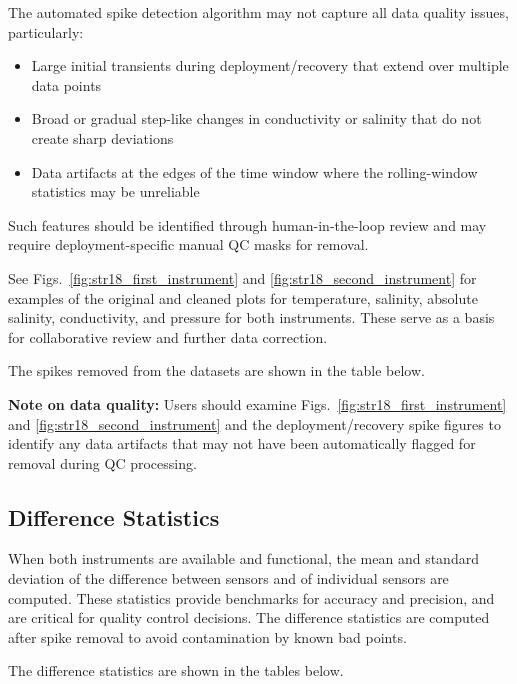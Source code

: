 The automated spike detection algorithm may not capture all data quality issues, particularly:
\begin{itemize}
    \item Large initial transients during deployment/recovery that extend over multiple data points
    \item Broad or gradual step-like changes in conductivity or salinity that do not create sharp deviations
    \item Data artifacts at the edges of the time window where the rolling-window statistics may be unreliable
\end{itemize}
Such features should be identified through human-in-the-loop review and may require deployment-specific manual QC masks for removal.

See Figs.~\ref{fig:str18_first_instrument} and \ref{fig:str18_second_instrument} for examples of the original and cleaned plots for temperature, salinity, absolute salinity, conductivity, and pressure for both instruments.
These serve as a basis for collaborative review and further data correction.

The spikes removed from the datasets are shown in the table below.



\textbf{Note on data quality:} Users should examine Figs.~\ref{fig:str18_first_instrument} and \ref{fig:str18_second_instrument} and the deployment/recovery spike figures to identify any data artifacts that may not have been automatically flagged for removal during QC processing.

\subsection{Difference Statistics}
When both instruments are available and functional, 
the mean and standard deviation of the difference between sensors and of individual sensors are computed. 
These statistics provide benchmarks for accuracy and precision, and are critical for quality control decisions.
The difference statistics are computed after spike removal to avoid contamination by known bad points.

The difference statistics are shown in the tables below.

